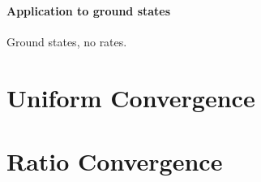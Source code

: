 \paragraph{Application to ground states}
%
Ground states, no rates.
%
%
%
%
\section{Uniform Convergence}\label{sec:UnifConv}
%
%
%
%
\section{Ratio Convergence}\label{sec:RatConv}
%

